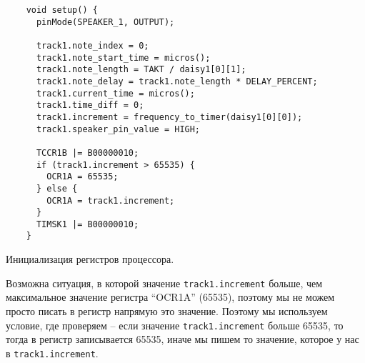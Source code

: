 \documentclass[../sparc.tex]{subfiles}
\begin{document}
\begin{listing}[H]
  \begin{verbatim}
    void setup() {
      pinMode(SPEAKER_1, OUTPUT);

      track1.note_index = 0;
      track1.note_start_time = micros();
      track1.note_length = TAKT / daisy1[0][1];
      track1.note_delay = track1.note_length * DELAY_PERCENT;
      track1.current_time = micros();
      track1.time_diff = 0;
      track1.increment = frequency_to_timer(daisy1[0][0]);
      track1.speaker_pin_value = HIGH;

      TCCR1B |= B00000010;
      if (track1.increment > 65535) {
        OCR1A = 65535;
      } else {
        OCR1A = track1.increment;
      }
      TIMSK1 |= B00000010;
    }
  \end{verbatim}
  \caption{Инициализация регистров процессора.}
  \label{listing:mcu-music-8}
\end{listing}

Возможна ситуация, в которой значение \texttt{track1.increment} больше,
чем максимальное значение регистра ``OCR1A'' (65535), поэтому мы не можем просто
писать в регистр напрямую это значение.  Поэтому мы используем условие, где
проверяем -- если значение \texttt{track1.increment} больше 65535, то
тогда в регистр записывается 65535, иначе мы пишем то значение, которое у нас в
\texttt{track1.increment}.
\end{document}
